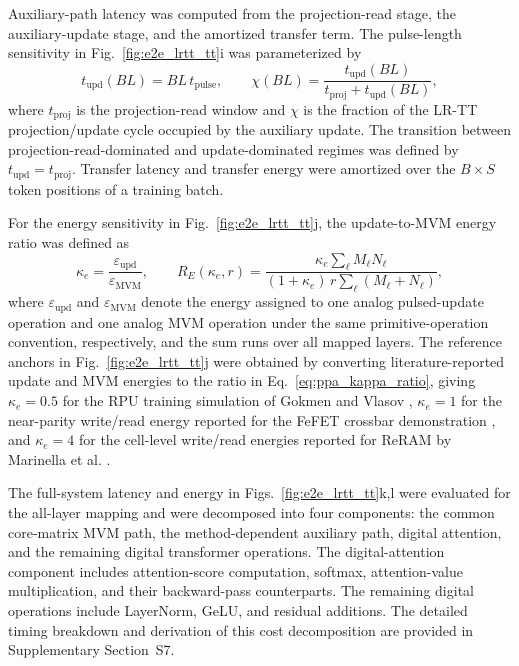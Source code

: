 \documentclass[fleqn,10pt]{wlscirep}
\begin{document}
\noindent
Auxiliary-path latency was computed from the projection-read stage, the auxiliary-update stage, and the amortized transfer term. The pulse-length sensitivity in Fig.~\ref{fig:e2e_lrtt_tt}i was parameterized by
\begin{equation}
t_{\mathrm{upd}}(BL)=BL\,t_{\mathrm{pulse}},
\qquad
\chi(BL)=\frac{t_{\mathrm{upd}}(BL)}
{t_{\mathrm{proj}}+t_{\mathrm{upd}}(BL)},
\label{eq:ppa_bl_latency_fraction}
\end{equation}
where \(t_{\mathrm{proj}}\) is the projection-read window and \(\chi\) is the fraction of the LR-TT projection/update cycle occupied by the auxiliary update. The transition between projection-read-dominated and update-dominated regimes was defined by \(t_{\mathrm{upd}}=t_{\mathrm{proj}}\). Transfer latency and transfer energy were amortized over the \(B\times S\) token positions of a training batch.

\noindent
For the energy sensitivity in Fig.~\ref{fig:e2e_lrtt_tt}j, the update-to-MVM energy ratio was defined as
\begin{equation}
\kappa_e=\frac{\varepsilon_{\mathrm{upd}}}{\varepsilon_{\mathrm{MVM}}},
\qquad
R_E(\kappa_e,r)=
\frac{\kappa_e\sum_{\ell}M_\ell N_\ell}
{(1+\kappa_e)\,r\sum_{\ell}(M_\ell+N_\ell)} ,
\label{eq:ppa_kappa_ratio}
\end{equation}
where \(\varepsilon_{\mathrm{upd}}\) and \(\varepsilon_{\mathrm{MVM}}\) denote the energy assigned to one analog pulsed-update operation and one analog MVM operation under the same primitive-operation convention, respectively, and the sum runs over all mapped layers. The reference anchors in Fig.~\ref{fig:e2e_lrtt_tt}j were obtained by converting literature-reported update and MVM energies to the ratio in Eq.~\eqref{eq:ppa_kappa_ratio}, giving \(\kappa_e=0.5\) for the RPU training simulation of Gokmen and Vlasov \cite{gokmen2016rpu}, \(\kappa_e=1\) for the near-parity write/read energy reported for the FeFET crossbar demonstration \cite{soliman2023fefet_crossbar}, and \(\kappa_e=4\) for the cell-level write/read energies reported for ReRAM by Marinella et al. \cite{marinella2018rram_training}.

\noindent
The full-system latency and energy in Figs.~\ref{fig:e2e_lrtt_tt}k,l were evaluated for the all-layer mapping and were decomposed into four components: the common core-matrix MVM path, the method-dependent auxiliary path, digital attention, and the remaining digital transformer operations. The digital-attention component includes attention-score computation, softmax, attention-value multiplication, and their backward-pass counterparts. The remaining digital operations include LayerNorm, GeLU, and residual additions. The detailed timing breakdown and derivation of this cost decomposition are provided in Supplementary Section~S7.
\end{document}

